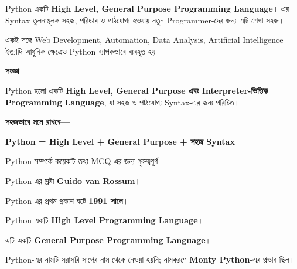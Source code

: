 
Python একটি \textbf{High Level, General Purpose Programming Language}।
এর Syntax তুলনামূলক সহজ, পরিষ্কার ও পাঠযোগ্য হওয়ায় নতুন
Programmer-দের জন্য এটি শেখা সহজ।

একই সঙ্গে Web Development, Automation, Data Analysis,
Artificial Intelligence ইত্যাদি আধুনিক ক্ষেত্রেও Python
ব্যাপকভাবে ব্যবহৃত হয়।


\begin{definitionbox}

\textbf{\color{darkTeal}সংজ্ঞা}

Python হলো একটি \textbf{High Level, General Purpose এবং
Interpreter-ভিত্তিক Programming Language}, যা সহজ ও পাঠযোগ্য
Syntax-এর জন্য পরিচিত।

\end{definitionbox}

\textbf{সহজভাবে মনে রাখবে—}

\begin{center}

\textbf{
Python
=
High Level
+
General Purpose
+
সহজ Syntax
}

\end{center}


Python সম্পর্কে কয়েকটি তথ্য MCQ-এর জন্য গুরুত্বপূর্ণ—

\begin{compacttwocolpoints}

\item Python-এর স্রষ্টা \textbf{Guido van Rossum}।

\item Python-এর প্রথম প্রকাশ ঘটে \textbf{1991 সালে}।

\item Python একটি \textbf{High Level Programming Language}।

\item এটি একটি \textbf{General Purpose Programming Language}।

\item Python-এর নামটি সরাসরি সাপের নাম থেকে নেওয়া হয়নি;
নামকরণে \textbf{Monty Python}-এর প্রভাব ছিল।

\end{compacttwocolpoints}

